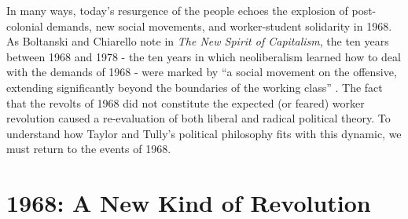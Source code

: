 \documentclass[12pt,oneside]{memoir}
\begin{document}
In many ways, today’s resurgence of the people echoes the explosion of post-colonial demands, new social movements, and worker-student solidarity in 1968. As Boltanski and Chiarello note in \emph{The New Spirit of Capitalism}, the ten years between 1968 and 1978 - the ten years in which neoliberalism learned how to deal with the demands of 1968 - were marked by “a social movement on the offensive, extending significantly beyond the boundaries of the working class” \citep[167]{BoltanskiChiarello2005}. The fact that the revolts of 1968 did not constitute the expected (or feared) worker revolution caused a re-evaluation of both liberal and radical political theory. To understand how Taylor and Tully’s political philosophy fits with this dynamic, we must return to the events of 1968.

\section*{1968: A New Kind of Revolution}






 


\backmatter

 

\end{document}
